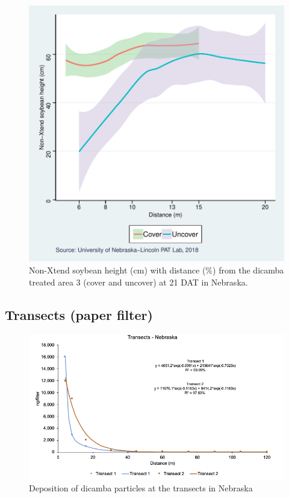 \documentclass[]{article}
\begin{document}
\begin{figure}
\centering
\includegraphics{Report_files/figure-latex/unnamed-chunk-83-1.pdf}
\caption{Non-Xtend soybean height (cm) with distance (\%) from the
dicamba treated area 3 (cover and uncover) at 21 DAT in Nebraska.}
\end{figure}

\pagebreak
\newpage

\subsection{Transects (paper filter)}\label{transects-paper-filter-3}

\begin{figure}[h]

{\centering \includegraphics[width=1\linewidth]{Ntransect} 

}

\caption{Deposition of dicamba particles at the transects in Nebraska}\label{fig:unnamed-chunk-84}
\end{figure}
\end{document}
